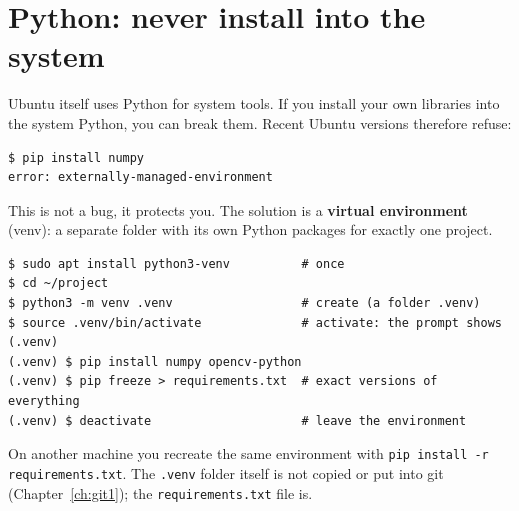 \section*{Python: never install into the system}
Ubuntu itself uses Python for system tools. If you install your own libraries into the system Python, you can break them. Recent Ubuntu versions therefore refuse:
\begin{verbatim}
$ pip install numpy
error: externally-managed-environment
\end{verbatim}
This is not a bug, it protects you. The solution is a \textbf{virtual environment} (venv): a separate folder with its own Python packages for exactly one project.
\begin{verbatim}
$ sudo apt install python3-venv          # once
$ cd ~/project
$ python3 -m venv .venv                  # create (a folder .venv)
$ source .venv/bin/activate              # activate: the prompt shows (.venv)
(.venv) $ pip install numpy opencv-python
(.venv) $ pip freeze > requirements.txt  # exact versions of everything
(.venv) $ deactivate                     # leave the environment
\end{verbatim}
On another machine you recreate the same environment with \verb|pip install -r requirements.txt|. The \texttt{.venv} folder itself is not copied or put into git (Chapter~\ref{ch:git1}); the \texttt{requirements.txt} file is.

\begin{center}
\label{fig:l4_venv}
\end{center}

